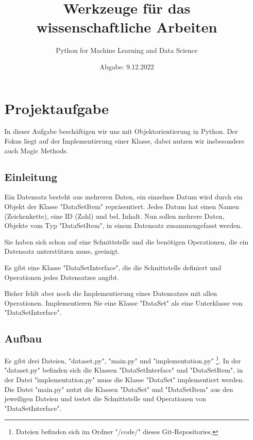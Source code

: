 \documentclass[
10pt,
a4paper
parskip=full
]{scrartcl}
\begin{document}
    \title{Werkzeuge für das wissenschaftliche Arbeiten}
    \author{Python for Machine Learning and Data Science}
    \date{Abgabe: 9.12.2022}
    \maketitle

    \tableofcontents

    \section{Projektaufgabe}
    In dieser Aufgabe beschäftigen wir uns mit Objektorientierung in Python. Der Fokus liegt auf der Implementierung einer Klasse, dabei nutzen wir insbesondere auch Magic Methods.

        \subsection{Einleitung}
        Ein Datensatz besteht aus mehreren Daten, ein einzelnes Datum wird durch ein Objekt der Klasse "DataSetItem" repräsentiert. Jedes Datum hat einen Namen (Zeichenkette), eine ID (Zahl) und bel. Inhalt. Nun sollen mehrere Daten, Objekte vom Typ "DataSetItem", in einem Datensatz zusammengefasst werden. 

        Sie haben sich schon auf eine Schnittstelle und die benötigen Operationen, die ein Datensatz unterstützen muss, geeinigt. 
        
        Es gibt eine Klasse "DataSetInterface", die die Schnittstelle definiert und Operationen jedes Datensatzes angibt. 
        
        Bisher fehlt aber noch die Implementierung eines Datensatzes mit allen Operationen. Implementieren Sie eine Klasse "DataSet" als eine Unterklasse von "DataSetInterface".

        \subsection{Aufbau}
        Es gibt drei Dateien, "dataset.py", "main.py" und "implementation.py" \footnote{\label{foot:1}Dateien befinden sich im Ordner "/code/" dieses Git-Repositories.}. In der "dataset.py" befinden sich die Klassen "DataSetInterface" und "DataSetItem", in der Datei "implementation.py" muss die Klasse "DataSet" implementiert werden. Die Datei "main.py" nutzt die Klassen "DataSet" und "DataSetItem" aus den jeweiligen Dateien und testet die Schnittstelle und Operationen von "DataSetInterface".
\end{document}
